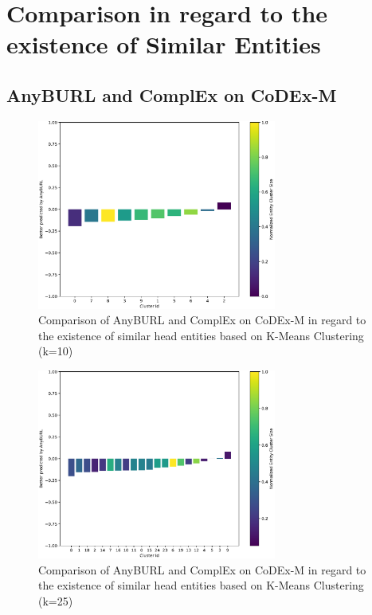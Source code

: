 \section{Comparison in regard to the existence of Similar Entities}
\label{appendix:similar_entities}
\subsection{AnyBURL and ComplEx on CoDEx-M}

\begin{figure}[H]
\centering
\includegraphics[width=0.7\textwidth]{images/head_cluster_10_anyburl_complex_codex.PNG}
\caption{Comparison of AnyBURL and ComplEx on CoDEx-M in regard to the existence of similar head entities based on K-Means Clustering (k=10)}
\label{fig:head_cluster_10_anyburl_complex_codex}
\end{figure}

\begin{figure}[H]
\centering
\includegraphics[width=0.7\textwidth]{images/head_cluster_25_anyburl_complex_codex.PNG}
\caption{Comparison of AnyBURL and ComplEx on CoDEx-M in regard to the existence of similar head entities based on K-Means Clustering (k=25)}
\label{fig:head_cluster_25_anyburl_complex_codex}
\end{figure}

